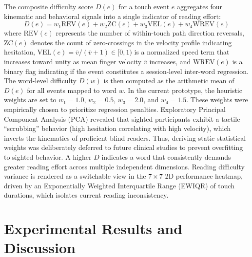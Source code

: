 \documentclass[conference]{IEEEtran}
\begin{document}
    The composite difficulty score $D(e)$ for a touch event $e$ aggregates four kinematic and behavioral signals into a single indicator of reading effort:
    \begin{equation}
        D(e) = w_1\mathrm{REV}(e) + w_2\mathrm{ZC}(e) + w_3\mathrm{VEL}(e) + w_4\mathrm{WREV}(e)
        \label{eq:difficulty}
    \end{equation}
    where $\mathrm{REV}(e)$ represents the number of within-touch path direction reversals, $\mathrm{ZC}(e)$ denotes the count of zero-crossings in the velocity profile indicating hesitation, $\mathrm{VEL}(e) = \bar{v}/(\bar{v}+1)\in[0,1)$
is a normalized speed term that increases toward unity as mean finger velocity
$\bar{v}$ increases, and $\mathrm{WREV}(e)$ is a binary flag indicating if the event constitutes a session-level inter-word regression. The word-level difficulty $D(w)$ is then computed as the arithmetic mean of $D(e)$ for all events mapped to word $w$. In the current prototype, the heuristic weights are set to $w_1=1.0$, $w_2=0.5$, $w_3=2.0$, and $w_4=1.5$. These weights were empirically chosen to prioritize regression penalties. Exploratory Principal Component Analysis (PCA) revealed that sighted participants exhibit a tactile ``scrubbing'' behavior (high hesitation correlating with high velocity), which inverts the kinematics of proficient blind readers. Thus, deriving static statistical weights was deliberately deferred to future clinical studies to prevent overfitting to sighted behavior.
    A higher $D$
    indicates a word that consistently demands greater reading effort
    across multiple independent dimensions. Reading difficulty variance is rendered as a switchable view in the $7\times7$ 2D performance heatmap, driven by an Exponentially Weighted Interquartile Range (EWIQR) of touch durations, which isolates current reading inconsistency.


    \section{Experimental Results and Discussion}
    \label{sec:results}
\end{document}
